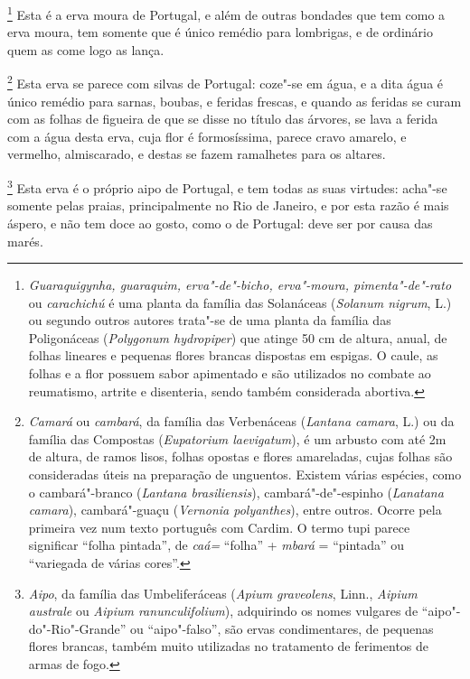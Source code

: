 \footnote{ \textit{Guaraquigynha, guaraquim,
erva"-de"-bicho, erva"-moura, pimenta"-de"-rato} ou \textit{carachichú} 
é uma planta da família das Solanáceas (\textit{Solanum nigrum}, L.) ou
segundo outros autores trata"-se de uma planta da família das
Poligonáceas (\textit{Polygonum hydropiper}) que atinge 50 cm de
altura, anual, de folhas lineares e pequenas flores brancas dispostas
em espigas. O caule, as folhas e a flor possuem sabor apimentado e são
utilizados no combate ao reumatismo, artrite e disenteria, sendo também
considerada abortiva.} Esta é a erva moura de Portugal, e
além de outras bondades que tem como a erva moura, tem somente que é
único remédio para lombrigas, e de ordinário quem as come logo as lança. 

\footnote{ \textit{Camará} ou \textit{cambará}, da
família das Verbenáceas (\textit{Lantana camara}, L.) ou da família das
Compostas (\textit{Eupatorium laevigatum}), é um arbusto com até 2m de
altura, de ramos lisos, folhas opostas e flores amareladas, cujas
folhas são consideradas úteis na preparação de unguentos. Existem várias
espécies, como o cambará"-branco (\textit{Lantana brasiliensis}), 
cambará"-de"-espinho (\textit{Lanatana camara}), cambará"-guaçu
(\textit{Vernonia polyanthes}), entre outros. Ocorre pela primeira vez
num texto português com Cardim. O termo tupi parece significar ``folha
pintada'', de \textit{caá=} ``folha'' + \textit{mbará} = ``pintada'' ou 
``variegada de várias cores''.} Esta erva se parece com silvas
de Portugal: coze"-se em água, e a dita água é único remédio para
sarnas, boubas, e feridas frescas, e quando as feridas se curam com as
folhas de figueira de que se disse no título das árvores, se lava a
ferida com a água desta erva, cuja flor é formosíssima, parece cravo
amarelo, e vermelho, almiscarado, e destas se fazem ramalhetes para os altares.

\footnote{ \textit{Aipo}, da família das Umbeliferáceas
(\textit{Apium graveolens}, Linn., \textit{Aipium australe} ou
\textit{Aipium ranunculifolium}), adquirindo os nomes vulgares de
``aipo"-do"-Rio"-Grande'' ou ``aipo"-falso'', são ervas condimentares, de
pequenas flores brancas, também muito utilizadas no tratamento de
ferimentos de armas de fogo.} Esta erva é o próprio aipo
de Portugal, e tem todas as suas virtudes: acha"-se somente pelas
praias, principalmente no Rio de Janeiro, e por esta razão é mais
áspero, e não tem doce ao gosto, como o de Portugal: deve ser por causa
das marés. 


